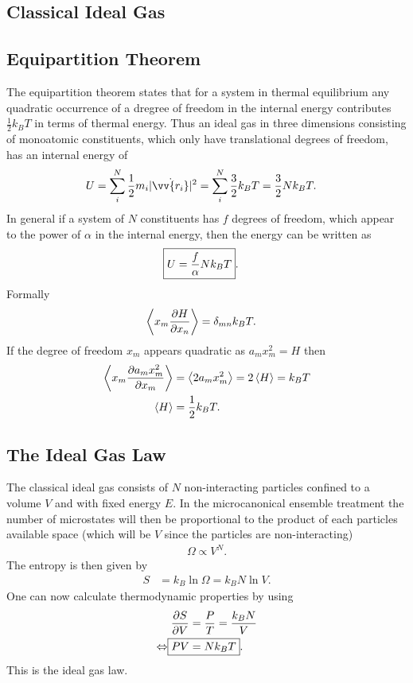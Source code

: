 \documentclass[a4paper,10pt]{article}
\numberwithin{equation}{section}
\begin{document}
\begin{multicols}{2}

\section{Classical Ideal Gas}
\subsection{Equipartition Theorem}
The equipartition theorem states that for a system in thermal equilibrium any quadratic occurrence of a dregree of freedom in the internal energy contributes $\tfrac{1}{2}k_BT$ in terms of thermal energy.
Thus an ideal gas in three dimensions consisting of monoatomic constituents, which only have translational degrees of freedom, has an internal energy of
\begin{align} 
  U &= \sum_{i}^{N}\dfrac{1}{2}m_i|\dot{\vv{r_i}}|^2=\sum_{i}^{N}\dfrac{3}{2}k_BT=\dfrac{3}{2}Nk_BT
.\end{align} 
In general if a system of $N$ constituents has $f$ degrees of freedom, which appear to the power of $\alpha $ in the internal energy, then the energy can be written as
\begin{align} 
  \Aboxed{U &= \dfrac{f}{\alpha }Nk_BT}
.\end{align} 
Formally
\begin{align} 
  \left\langle x_m\diffp[]{H}{x_n} \right\rangle &= \delta _{mn}k_BT
.\end{align} 
If the degree of freedom $x_m$ appears quadratic as $a_mx_m^2=H$ then
\begin{align} 
  \left\langle x_m\diffp[]{a_mx_m^2}{x_m}\right\rangle &=\left\langle 2a_mx_m^2\right\rangle =2\left\langle H\right\rangle =k_BT\\
  \left\langle H\right\rangle &=\dfrac{1}{2}k_BT
.\end{align} 

\subsection{The Ideal Gas Law}
The classical ideal gas consists of $N$ non-interacting particles confined to a volume $V$ and with fixed energy $E$.
In the microcanonical ensemble treatment the number of microstates will then be proportional to the product of each particles available space (which will be $V$ since the particles are non-interacting)
\begin{align} 
  \Omega \propto V^N
.\end{align} 
The entropy is then given by
\begin{align}
  S &= k_B\ln \Omega =k_BN\ln V
.\end{align} 
One can now calculate thermodynamic properties by using
\begin{align} 
  \diffp[]{S}{V} &= \dfrac{P}{T} = \dfrac{k_BN}{V}\\
  \Leftrightarrow \Aboxed{PV &= Nk_BT}
.\end{align} 
This is the ideal gas law.


\end{multicols}
\end{document}

